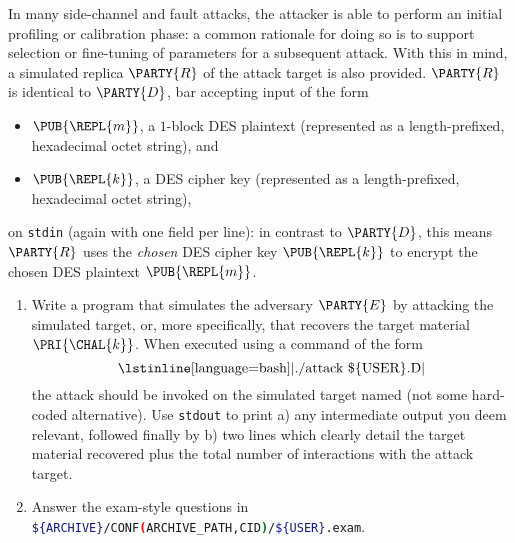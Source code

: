 \documentclass[crop={false},multi={true},tikz={true}]{standalone}
\begin{document}

In many side-channel and fault attacks, the attacker is able to perform an 
initial profiling or calibration phase: a common rationale for doing so is 
to support selection or fine-tuning of parameters for a subsequent attack.  
With this in mind, a simulated replica $\PARTY{R}$ of the attack target is 
also provided.
$\PARTY{R}$ is identical to $\PARTY{D}$, bar accepting input of the form

\begin{itemize}
\item $\PUB{\REPL{m}}$, 
      a  $1$-block DES plaintext
      (represented as a  length-prefixed, hexadecimal octet   string), 
      and
\item $\PUB{\REPL{k}}$, 
      a           DES cipher key
      (represented as a  length-prefixed, hexadecimal octet   string), 
\end{itemize}

\noindent
on \lstinline[language={bash}]{stdin} (again with one field per line):
in contrast to $\PARTY{D}$, this means $\PARTY{R}$ uses the
{\em chosen} DES cipher key $\PUB{\REPL{k}}$
to encrypt the
     chosen  DES  plaintext $\PUB{\REPL{m}}$.


\begin{enumerate}
\item Write a program that simulates the adversary $\PARTY{E}$ by attacking
      the simulated target, or, more specifically, that recovers the target 
      material $\PRI{\CHAL{k}}$.  
      When executed using a command of the form
      \[
      \mbox{\lstinline[language={bash}]|./attack \$\{USER\}.D|}
      \]
      the attack should be invoked on the simulated target named (not some
      hard-coded alternative).  Use \lstinline[language={bash}]{stdout} to 
      print 
      a) any intermediate output you deem relevant, followed finally by 
      b) two lines which clearly detail the target material recovered plus
         the total number of interactions with the attack target.
\item Answer the exam-style questions in 
      \lstinline[language={bash}]|${ARCHIVE}/CONF(ARCHIVE_PATH,CID)/${USER}.exam|.
\end{enumerate}


\ifstandalone
\printbibliography
\fi
\end{document}
